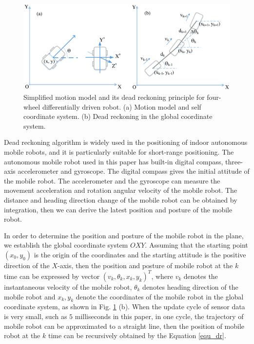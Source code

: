 \documentclass{llncs}
\begin{document}
\begin{figure}[!htbp]
	\centering
	\includegraphics[width=4.7in]{RobotMatch-MotionModel}
	\caption{Simplified motion model and its dead reckoning principle for four-wheel differentially driven robot. (a) Motion model and self coordinate system. (b) Dead reckoning in the global coordinate system.}
	\label{fig-model-dr}
\end{figure}

Dead reckoning algorithm is widely used in the positioning of indoor autonomous mobile robots, and it is particularly suitable for short-range positioning. The autonomous mobile robot used in this paper has built-in digital compass, three-axis accelerometer and gyroscope. The digital compass gives the initial attitude of the mobile robot. The accelerometer and the gyroscope can measure the movement acceleration and rotation angular velocity of the mobile robot. The distance and heading direction change of the mobile robot can be obtained by integration, then we can derive the latest position and posture of the mobile robot.

In order to determine the position and posture of the mobile robot in the plane, we establish the global coordinate system $OXY$. Assuming that the starting point $(x_0, y_0)$ is the origin of the coordinates and the starting attitude is the positive direction of the $X$-axis, then the position and posture of mobile robot at the $k$ time can be expressed by vector ${({v_k},{\theta _k},{x_k},{y_k})^T}$, where $v_k$ denotes the instantaneous velocity of the mobile robot, ${\theta _k}$ denotes heading direction of the mobile robot and ${x_k},{y_k}$ denote the coordinates of the mobile robot in the global coordinate system, as shown in Fig. \ref{fig-model-dr} (b). When the update cycle of sensor data is very small, such as $5$ milliseconds in this paper, in one cycle, the trajectory of mobile robot can be approximated to a straight line, then the position of mobile robot at the $k$ time can be recursively obtained by the Equation \ref{equ_dr}.
\end{document}
